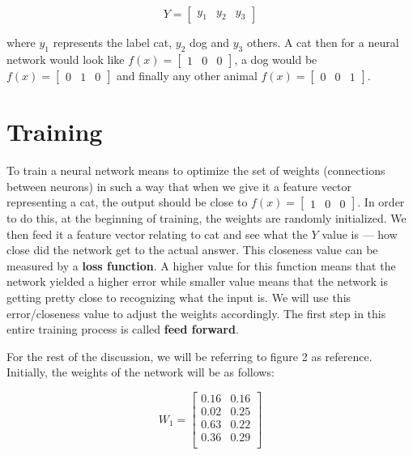 \documentclass[a4paper]{article}
\begin{document}
\begin{equation}
  Y=\begin{bmatrix}
    y_{1} &   y_{2} & y_{3}
  \end{bmatrix}
\end{equation}

where $y_{1}$ represents the label cat, $y_{2}$ dog and $y_{3}$ others. A cat then for a neural network would look like $f(x) = \begin{bmatrix} 1 &   0 & 0 \end{bmatrix}$, a dog would be $f(x) = \begin{bmatrix} 0 &  1 & 0 \end{bmatrix}$ and finally any other animal $f(x) = \begin{bmatrix} 0 & 0 & 1 \end{bmatrix}$.

\section{Training}

To train a neural network means to optimize the set of weights (connections between neurons) in such a way that when we give it a feature vector representing a cat, the output should be close to $f(x) = \begin{bmatrix} 1 & 0 & 0 \end{bmatrix}$. In order to do this, at the beginning of training, the weights are randomly initialized. We then feed it a feature vector relating to cat and see what the $Y$ value is --- how close did the network get to the actual answer. This closeness value can be measured by a \textbf{loss function}. A higher value for this function means that the network yielded a higher error while smaller value means that the network is getting pretty close to recognizing what the input is. We will use this error/closeness value to adjust the weights accordingly. The first step in this entire training process is called \textbf{feed forward}. 

For the rest of the discussion, we will be referring to figure 2 as reference. Initially, the weights of the network will be as follows:

\begin{equation}
  W_{1}=
    \begin{bmatrix}
      0.16  & 0.16 \\
      0.02  & 0.25 \\
      0.63  & 0.22 \\
      0.36  & 0.29 \\
    \end{bmatrix}
\end{equation}
\end{document}
